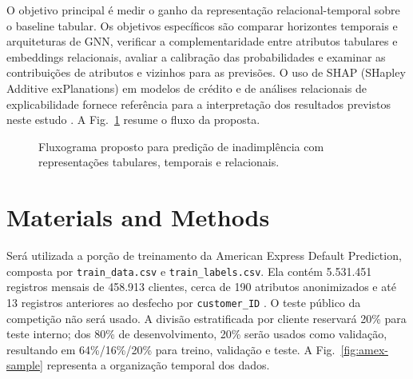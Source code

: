 \documentclass[conference]{IEEEtran}
\begin{document}
O objetivo principal é medir o ganho da representação relacional-temporal sobre o baseline tabular. Os objetivos específicos são comparar horizontes temporais e arquiteturas de GNN, verificar a complementaridade entre atributos tabulares e embeddings relacionais, avaliar a calibração das probabilidades e examinar as contribuições de atributos e vizinhos para as previsões. O uso de SHAP (SHapley Additive exPlanations) em modelos de crédito e de análises relacionais de explicabilidade fornece referência para a interpretação dos resultados previstos neste estudo \cite{BITETTO2023101746,yang2025interpretable,yang2026relationalgraphmodelingcredit}. A Fig.~\ref{fig:diagram-solution-planning} resume o fluxo da proposta.

\begin{figure}[htbp]
    \centering
    
    \vspace{-2mm}
    \caption{Fluxograma proposto para predição de inadimplência com representações tabulares, temporais e relacionais.}
    \label{fig:diagram-solution-planning}
\end{figure}

\section{Materials and Methods}
\label{sec:materials}

Será utilizada a porção de treinamento da American Express Default Prediction, composta por \texttt{train\_data.csv} e \texttt{train\_labels.csv}. Ela contém 5.531.451 registros mensais de 458.913 clientes, cerca de 190 atributos anonimizados e até 13 registros anteriores ao desfecho por \texttt{customer\_ID} \cite{amex-default-prediction}. O teste público da competição não será usado. A divisão estratificada por cliente reservará 20\% para teste interno; dos 80\% de desenvolvimento, 20\% serão usados como validação, resultando em 64\%/16\%/20\% para treino, validação e teste. A Fig.~\ref{fig:amex-sample} representa a organização temporal dos dados.
\end{document}
